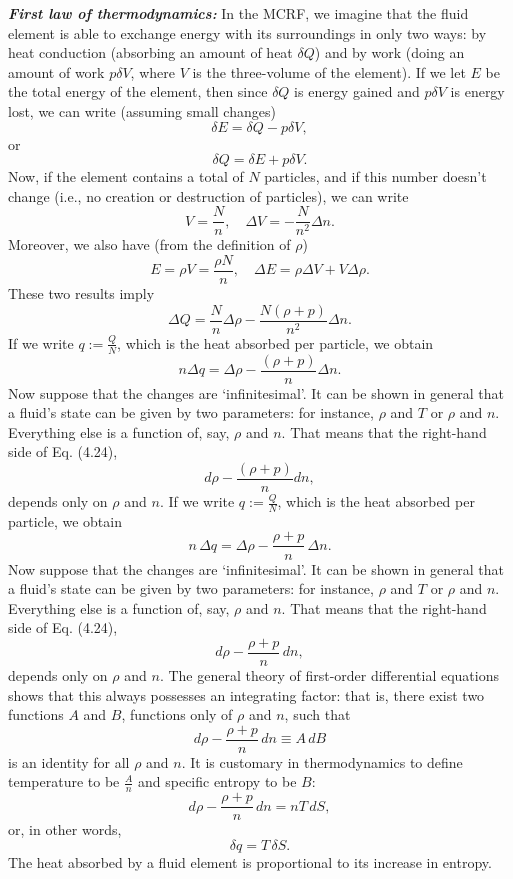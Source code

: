 \documentclass[12pt]{book}
\begin{document}
    \textit{\textbf{First law of thermodynamics:}}
    In the MCRF, we imagine that the fluid element is able to exchange energy with its surroundings in only two ways: by heat conduction (absorbing an amount of heat \(\delta Q\)) and by work (doing an amount of work \(p \delta V\), where \(V\) is the three-volume of the element). If we let \(E\) be the total energy of the element, then since \(\delta Q\) is energy gained and \(p \delta V\) is energy lost, we can write (assuming small changes)
    \[
    \delta E = \delta Q - p \delta V,
    \]
    or
    \[
    \delta Q = \delta E + p \delta V.
    \tag{4.22}
    \]
    Now, if the element contains a total of \(N\) particles, and if this number doesn’t change (i.e., no creation or destruction of particles), we can write
    \[
    V = \frac{N}{n}, \quad \Delta V = -\frac{N}{n^2} \Delta n. \tag{4.23}
    \]
    Moreover, we also have (from the definition of \(\rho\))
    \[
    E = \rho V = \frac{\rho N}{n}, \quad \Delta E = \rho \Delta V + V \Delta \rho.
    \]
    These two results imply
    \[
    \Delta Q = \frac{N}{n} \Delta \rho - \frac{N(\rho + p)}{n^2} \Delta n.
    \]
    If we write \(q := \frac{Q}{N}\), which is the heat absorbed per particle, we obtain
    \[
    n \Delta q = \Delta \rho - \frac{(\rho + p)}{n} \Delta n. \tag{4.24}
    \]
    Now suppose that the changes are ‘infinitesimal’. It can be shown in general that a fluid’s state can be given by two parameters: for instance, \(\rho\) and \(T\) or \(\rho\) and \(n\). Everything else is a function of, say, \(\rho\) and \(n\). That means that the right-hand side of Eq. (4.24),
    \[
    d\rho - \frac{(\rho + p)}{n} dn,
    \]
    depends only on \(\rho\) and \(n\). If we write \( q := \frac{Q}{N} \), which is the heat absorbed per particle, we obtain
    \[
    n \, \Delta q = \Delta \rho - \frac{\rho + p}{n} \, \Delta n. \tag{4.24}
    \]
    Now suppose that the changes are ‘infinitesimal’. It can be shown in general that a fluid’s state can be given by two parameters: for instance, \(\rho\) and \(T\) or \(\rho\) and \(n\). Everything else is a function of, say, \(\rho\) and \(n\). That means that the right-hand side of Eq. (4.24),
    \[
    d\rho - \frac{\rho + p}{n} \, dn,
    \]
    depends only on \(\rho\) and \(n\). The general theory of first-order differential equations shows that this always possesses an integrating factor: that is, there exist two functions \(A\) and \(B\), functions only of \(\rho\) and \(n\), such that
    \[
    d\rho - \frac{\rho + p}{n} \, dn \equiv A \, dB
    \]
    is an identity for all \(\rho\) and \(n\). It is customary in thermodynamics to define temperature to be \( \frac{A}{n} \) and specific entropy to be \( B \):
    \[
    d\rho - \frac{\rho + p}{n} \, dn = nT \, dS, \tag{4.25}
    \]
    or, in other words,
    \[
    \delta q = T \, \delta S. \tag{4.26}
    \]
    The heat absorbed by a fluid element is proportional to its increase in entropy.
\end{document}
